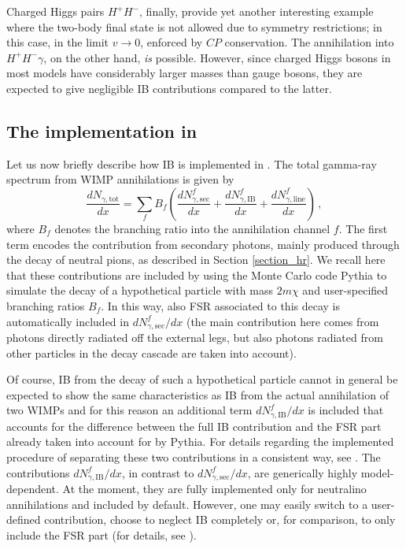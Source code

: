 Charged Higgs pairs $H^+H^-$, finally, provide yet another interesting example 
where the two-body final state is not allowed due to symmetry restrictions; in this 
case, in the limit $v\rightarrow0$, enforced by  $CP$ conservation. The 
annihilation into $H^+H^-\gamma$, on the other hand, \emph{is} possible. However, 
since charged Higgs bosons in most models have considerably larger masses than 
gauge bosons, they are expected to give negligible IB contributions compared to the 
latter.

\subsection{The implementation in \ds}

Let us now briefly describe how  IB is implemented in \ds. The total gamma-ray 
spectrum  from WIMP annihilations is given by
\begin{equation}
  \frac{dN_{\gamma,\mathrm{tot}}}{dx}=\sum_f 
B_f\left(\frac{dN^f_{\gamma,\mathrm{sec}}}{dx}+\frac{dN^f_{\gamma,\mathrm{IB}}}{dx} 
+ \frac{dN^f_{\gamma,\mathrm{line}}}{dx}\right)\,,
\end{equation}
where $B_f$ denotes the branching ratio into the annihilation channel $f$. The 
first term encodes the contribution from secondary photons, mainly produced through 
the decay of neutral pions, as described in Section \ref{section_hr}.
 We recall here that these contributions are included by using the Monte Carlo code 
{\sf Pythia} \cite{pythia} to simulate the decay of a hypothetical particle with 
mass 
$2m\chi$ and user-specified branching ratios $B_f$.  In this way, also FSR 
associated to this decay  is automatically included in 
${dN^f_{\gamma,\mathrm{sec}}}/{dx}$ (the main contribution here comes from photons 
directly radiated off the external legs, but also photons radiated from other 
particles in the decay cascade are taken into account). 

Of course, IB from the decay of such a hypothetical particle cannot in general be 
expected  to show the same characteristics as IB from the actual annihilation of 
two WIMPs and for this reason an additional term ${dN^f_{\gamma,\mathrm{IB}}}/{dx}$ 
is included that accounts for the difference between the full IB contribution and 
the FSR part already taken into account for by {\sf Pythia}. For details regarding 
the 
implemented procedure of separating these two contributions in a consistent way, 
see \cite{ib_susy}.
The contributions ${dN^f_{\gamma,\mathrm{IB}}}/{dx}$, in contrast to 
${dN^f_{\gamma,\mathrm{sec}}}/{dx}$, are generically highly model-dependent. At the 
moment, they are fully implemented only for neutralino annihilations and included 
by default. However, one may easily switch to a user-defined contribution, choose 
to neglect IB completely or, for comparison, to only include the FSR part (for 
details, see 
). 

